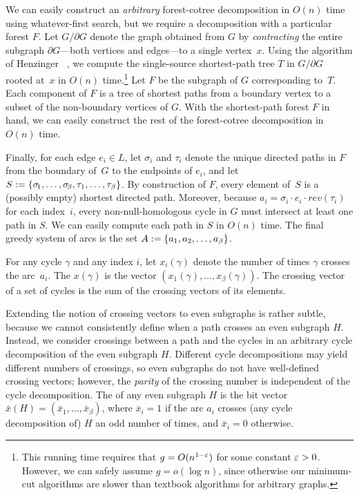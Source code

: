 \documentclass[11pt,twoside]{article}
\def\rev{\mathit{rev}}
\begin{document}
We can easily construct an \emph{arbitrary} forest-cotree decomposition in $O(n)$ time using whatever-first search, but we require a decomposition with a particular forest $F$.  Let $G/\partial G$ denote the graph obtained from $G$ by \emph{contracting} the entire subgraph $\partial G$---both vertices and edges---to a single vertex~$x$.  Using the algorithm of Henzinger \etal~\cite{hkrs-fspap-97}, we compute the single-source shortest-path tree $T$ in $G/\partial G$ rooted at~$x$ in $O(n)$ time.\footnote{This running time requires that $g = O(n^{1-\varepsilon})$ for some constant $\varepsilon>0$.  However, we can safely assume $g = o(\log n)$, since otherwise our minimum-cut algorithms are slower than textbook algorithms for arbitrary graphs.}  Let $F$ be the subgraph of $G$ corresponding to~$T$.  Each component of $F$ is a tree of shortest paths from a boundary vertex to a subset of the non-boundary vertices of $G$.  With the shortest-path forest $F$ in hand, we can easily construct the rest of the forest-cotree decomposition in $O(n)$ time.

Finally, for each edge $e_i\in L$, let $\sigma_i$ and $\tau_i$ denote the unique directed paths in $F$ from the boundary of~$G$ to the endpoints of $e_i$, and let $S := \{ \sigma\!_1, \dots, \sigma\!_\beta, \allowbreak \tau_1, \dots, \tau_\beta \}$.  By construction of $F$, every element of~$S$ is a (possibly empty) shortest directed path.  Moreover, because $a_i = \sigma_i \cdot e_i \cdot \rev(\tau_i)$ for each index~$i$, every non-null-homologous cycle in $G$ must intersect at least one path in $S$.  We can easily compute each path in $S$ in $O(n)$ time.  The final greedy system of arcs is the set $A := \{ a_1, a_2, \dots, a_\beta \}$.

For any cycle $\gamma$ and any index $i$, let $x_i(\gamma)$ denote the number of times $\gamma$ crosses the arc~$a_i$.  The  $x(\gamma)$ is the vector $(x_1(\gamma), \dots, x_\beta(\gamma))$.  The crossing vector of a set of cycles is the sum of the crossing vectors of its elements.

Extending the notion of crossing vectors to even subgraphs is rather subtle, because we cannot consistently define when a path crosses an even subgraph $H$.  Instead, we consider crossings between a path and the cycles in an arbitrary cycle decomposition of the even subgraph $H$.  Different cycle decompositions may yield different numbers of crossings, so even subgraphs do not have well-defined crossing vectors; however, the \emph{parity} of the crossing number is independent of the cycle decomposition.  The  of any even subgraph $H$ is the bit vector $\bar{x}(H) = (\bar{x}_1, \dots, \bar{x}_\beta)$, where $\bar{x}_i = 1$ if the arc $a_i$ crosses (any cycle decomposition of) $H$ an odd number of times, and $\bar{x}_i = 0$ otherwise.
\end{document}
